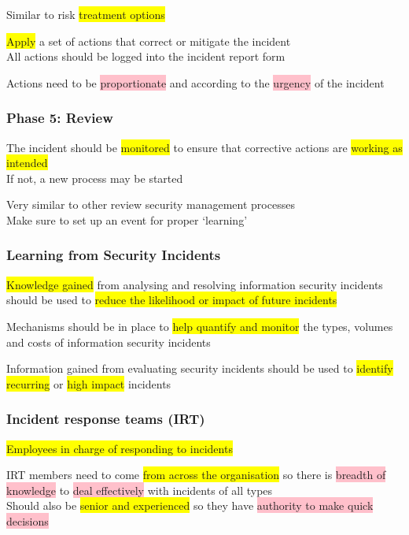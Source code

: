 \documentclass[tikz,border=10pt]{project_plan}
\begin{document}
Similar to risk \colorbox{yellow}{treatment options}

\colorbox{yellow}{Apply} a set of actions that correct or mitigate the incident\\
All actions should be logged into the incident report form

Actions need to be \colorbox{pink}{proportionate} and according to the \colorbox{pink}{urgency} of the incident

\subsubsection{Phase 5: Review}

The incident should be \colorbox{yellow}{monitored} to ensure that corrective actions are \colorbox{yellow}{working as intended}\\
If not, a new process may be started

Very similar to other review security management processes\\
Make sure to set up an event for proper ‘learning’

\subsubsection{Learning from Security Incidents}

\colorbox{yellow}{Knowledge gained} from analysing and resolving information security incidents should
be used to \colorbox{yellow}{reduce the likelihood or impact of future incidents}

Mechanisms should be in place to \colorbox{yellow}{help quantify and monitor} the types, volumes
and costs of information security incidents

Information gained from evaluating security incidents should be used to \colorbox{yellow}{identify recurring} or \colorbox{yellow}{high impact} incidents

\subsubsection{Incident response teams (IRT)}
\colorbox{yellow}{Employees in charge of responding to incidents}

IRT members need to come \colorbox{yellow}{from across the organisation} so there is \colorbox{pink}{breadth of knowledge} to \colorbox{pink}{deal effectively} with incidents of all types\\
Should also be \colorbox{yellow}{senior and experienced} so they have \colorbox{pink}{authority to make quick decisions}
\end{document}
